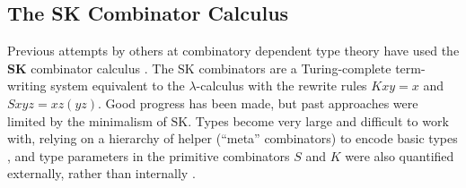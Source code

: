 \documentclass{article}
\newcommand{\sk}{\(\text{SK}\)}
\newcommand{\skbf}{\(\textbf{SK}\)}
\begin{document}

\subsection{\label{skcomp}The SK Combinator Calculus}

Previous attempts by others at combinatory dependent type theory have used the \skbf{} combinator calculus \autocite[p. 10:14]{altenkirch}. The \sk{} combinators are a Turing-complete term-writing system equivalent to the \(\lambda\)-calculus \cite{altenkirch2023combinatory} with the rewrite rules \(K x y = x\) and \(S x y z = x z (y z)\). Good progress has been made, but past approaches were limited by the minimalism of \sk{}. Types become very large and difficult to work with, relying on a hierarchy of helper (``meta'' combinators) to encode basic types \autocite[10:17][para. 2]{altenkirch}, and type parameters in the primitive combinators \(S\) and \(K\) were also quantified externally, rather than internally \autocite[10:17][para. 2]{altenkirch}.
\end{document}
